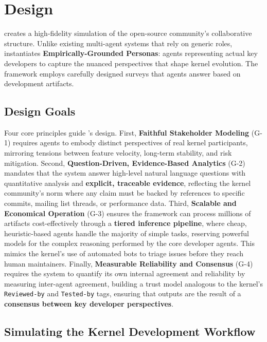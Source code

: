 
\section{Design}
\label{sec:design}

\sys creates a high-fidelity simulation of the open-source community's collaborative structure. Unlike existing multi-agent systems that rely on generic roles, \sys instantiates \textbf{Empirically-Grounded Personas}: agents representing actual key developers to capture the nuanced perspectives that shape kernel evolution. The framework employs carefully designed surveys that agents answer based on development artifacts.

\subsection{Design Goals}

Four core principles guide \sys's design. First, \textbf{Faithful Stakeholder Modeling} (G-1) requires agents to embody distinct perspectives of real kernel participants, mirroring tensions between feature velocity, long-term stability, and risk mitigation. Second, \textbf{Question-Driven, Evidence-Based Analytics} (G-2) mandates that the system answer high-level natural language questions with quantitative analysis and \textbf{explicit, traceable evidence}, reflecting the kernel community's norm where any claim must be backed by references to specific commits, mailing list threads, or performance data. Third, \textbf{Scalable and Economical Operation} (G-3) ensures the framework can process millions of artifacts cost-effectively through a \textbf{tiered inference pipeline}, where cheap, heuristic-based agents handle the majority of simple tasks, reserving powerful models for the complex reasoning performed by the core developer agents. This mimics the kernel's use of automated bots to triage issues before they reach human maintainers. Finally, \textbf{Measurable Reliability and Consensus} (G-4) requires the system to quantify its own internal agreement and reliability by measuring inter-agent agreement, building a trust model analogous to the kernel's \texttt{Reviewed-by} and \texttt{Tested-by} tags, ensuring that outputs are the result of a \textbf{consensus between key developer perspectives}.


\subsection{Simulating the Kernel Development Workflow}

